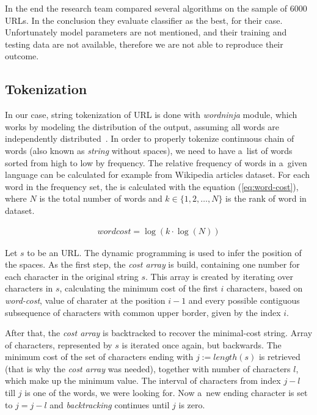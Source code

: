 In the end the research team compared several algorithms on the sample of \num{6000} URLs. In the conclusion they evaluate  classifier as the best, for their case.
Unfortunately model parameters are not mentioned, and their training and testing data are not available, therefore we are not able to reproduce their outcome.

\subsection{Tokenization}\label{subsec:tokenization}

In our case, string tokenization of URL is done with \textit{wordninja} module, which works by modeling the distribution of the output, assuming all words are independently distributed~\cite{stackoverflow:tokenizer}.
In order to properly tokenize continuous chain of words (also known as \textit{string} without spaces), we need to have a~list of words sorted from high to low by frequency.
The relative frequency of words in a~given language can be calculated for example from Wikipedia articles dataset.
For each word in the frequency set, the  is calculated with the equation (\ref{eq:word-cost}), where \( N \) is the total number of words and \( k \in \{ 1, 2, \ldots, N \} \) is the rank of word in dataset.

\begin{align}
    wordcost = \log\left( k \cdot \log(N) \right) \label{eq:word-cost}
\end{align}

Let \( s \) to be an URL\@.
The dynamic programming is used to infer the position of the spaces.
As the first step, the \textit{cost array} is build, containing one number for each character in the original string \( s \).
This array is created by iterating over characters in \( s \), calculating the minimum cost of the first \( i \) characters, based on \textit{word-cost}, value of charater at the position \( i - 1 \) and every possible contiguous subsequence of characters with common upper border, given by the index \( i \).

After that, the \textit{cost array} is backtracked to recover the minimal-cost string.
Array of characters, represented by \( s \) is iterated once again, but backwards.
The minimum cost of the set of characters ending with \( j := length(s) \) is retrieved (that is why the \textit{cost array} was needed), together with number of characters \( l \), which make up the minimum value.
The interval of characters from index \( j - l \) till \( j \) is one of the words, we were looking for.
Now a~new ending character is set to \( j = j - l \) and \textit{backtracking} continues until \( j \) is zero.

